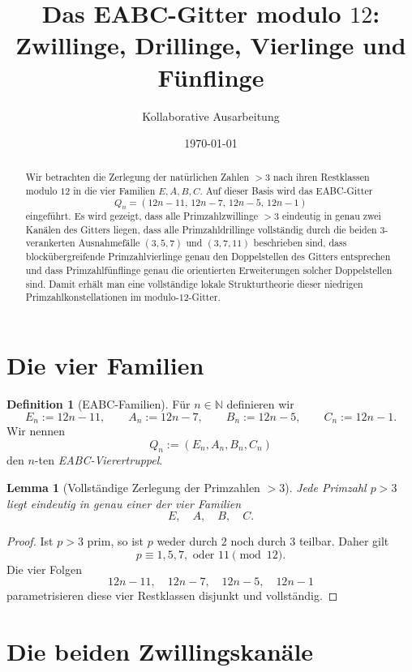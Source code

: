 \documentclass[11pt,a4paper]{article}
\title{Das EABC-Gitter modulo \(12\):\\
	Zwillinge, Drillinge, Vierlinge und Fünflinge}
\author{Kollaborative Ausarbeitung}
\date{\today}
\newtheorem{lemma}[satz]{Lemma}
\theoremstyle{definition}
\newtheorem{definition}[satz]{Definition}
\theoremstyle{remark}
\newcommand{\N}{\mathbb{N}}
\begin{document}
	\maketitle
	
	\begin{abstract}
		Wir betrachten die Zerlegung der natürlichen Zahlen \(>3\) nach ihren Restklassen modulo \(12\)
		in die vier Familien \(E,A,B,C\). Auf dieser Basis wird das EABC-Gitter
		\[
		Q_n=(12n-11,\,12n-7,\,12n-5,\,12n-1)
		\]
		eingeführt. Es wird gezeigt, dass alle Primzahlzwillinge \(>3\) eindeutig in genau zwei
		Kanälen des Gitters liegen, dass alle Primzahldrillinge vollständig durch die beiden
		\(3\)-verankerten Ausnahmefälle \((3,5,7)\) und \((3,7,11)\) beschrieben sind, dass
		blockübergreifende Primzahlvierlinge genau den Doppelstellen des Gitters entsprechen und
		dass Primzahlfünflinge genau die orientierten Erweiterungen solcher Doppelstellen sind.
		Damit erhält man eine vollständige lokale Strukturtheorie dieser niedrigen
		Primzahlkonstellationen im modulo-\(12\)-Gitter.
	\end{abstract}
	
	\section{Die vier Familien}
	
	\begin{definition}[EABC-Familien]
		Für \(n\in\N\) definieren wir
		\[
		E_n:=12n-11,\qquad
		A_n:=12n-7,\qquad
		B_n:=12n-5,\qquad
		C_n:=12n-1.
		\]
		Wir nennen
		\[
		Q_n:=(E_n,A_n,B_n,C_n)
		\]
		den \(n\)-ten \emph{EABC-Vierertruppel}.
	\end{definition}
	
	\begin{lemma}[Vollständige Zerlegung der Primzahlen \(>3\)]
		Jede Primzahl \(p>3\) liegt eindeutig in genau einer der vier Familien
		\[
		E,\quad A,\quad B,\quad C.
		\]
	\end{lemma}
	
	\begin{proof}
		Ist \(p>3\) prim, so ist \(p\) weder durch \(2\) noch durch \(3\) teilbar. Daher gilt
		\[
		p\equiv 1,5,7,\text{ oder }11 \pmod{12}.
		\]
		Die vier Folgen
		\[
		12n-11,\quad 12n-7,\quad 12n-5,\quad 12n-1
		\]
		parametrisieren diese vier Restklassen disjunkt und vollständig.
	\end{proof}
	
	\section{Die beiden Zwillingskanäle}
	
\end{document}

